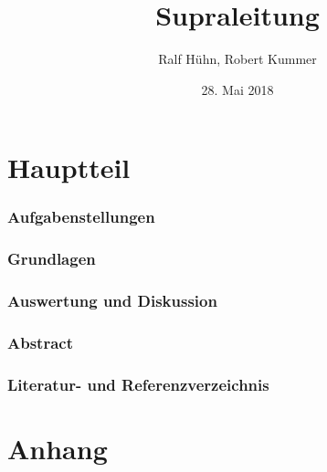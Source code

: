 \documentclass[paper=a4,10pt]{scrartcl}
\title{Supraleitung}
\author{Ralf Hühn, Robert Kummer}
\date{28. Mai 2018}
\begin{document}
\maketitle
\newpage
{}
\setcounter{page}{1}
\tableofcontents
\newpage

\part{Hauptteil}
\section{Aufgabenstellungen}

\newpage
\section{Grundlagen}

\newpage
\section{Auswertung und Diskussion}

\newpage
\section{Abstract}

\newpage
\section{Literatur- und Referenzverzeichnis}
\renewcommand{\refname}{Literatur und Referenzen}
\nocite{*}

%
\part{Anhang}
\end{document}
